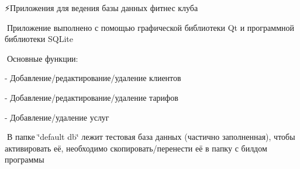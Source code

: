 ⚡Приложения для ведения базы данных фитнес клуба

📄Приложение выполнено с помощью графической библиотеки Qt и программной библиотеки SQLite

🔨Основные функции\+: \begin{DoxyVerb}- Добавление/редактирование/удаление клиентов

- Добавление/редактирование/удаление тарифов

- Добавление/удаление услуг
\end{DoxyVerb}
 🔧В папке \char`\"{}default db\char`\"{} лежит тестовая база данных (частично заполненная), чтобы активировать её, необходимо скопировать/перенести её в папку с билдом программы 